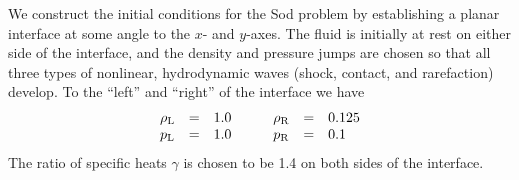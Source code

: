 We construct the initial conditions for the Sod problem by establishing a
planar interface at some angle to the $x$- and $y$-axes. The fluid is initially
at rest on either side of the interface, and the density and pressure jumps
are chosen so that all three types of nonlinear, hydrodynamic waves
(shock, contact, and rarefaction) develop.
To the ``left'' and ``right'' of the interface we have
\begin{equation}
\begin{array}{lclcclcl}
\rho_{\rm L} &=& 1.0 &   &   & \rho_{\rm R} &=& 0.125\\
p_{\rm L}    &=& 1.0 &   &   & p_{\rm R}    &=& 0.1
\end{array}
\end{equation}
The ratio of specific heats $\gamma$ is chosen to be 1.4 on both sides of
the interface.

